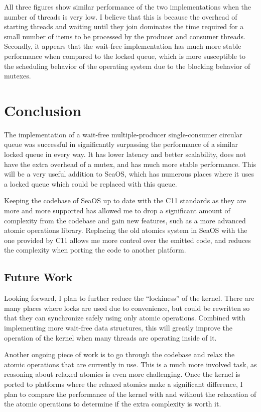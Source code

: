 \documentclass[12pt]{article}
\begin{document}
All three figures show similar performance of the two implementations when
the number of threads is very low. I believe that this is because the overhead
of starting threads and waiting until they join dominates the time required
for a small number of items to be processed by the producer and consumer threads.
Secondly, it appears that the wait-free implementation has much more stable
performance when compared to the locked queue, which is more susceptible to
the scheduling behavior of the operating system due to the blocking behavior
of mutexes.


\section{Conclusion}

The implementation of a wait-free multiple-producer single-consumer circular queue
was successful in significantly surpassing the performance of a similar locked queue in every way.
It has lower latency and better scalability, does not have the extra
overhead of a mutex, and has much more stable performance.
This will be a very useful addition to SeaOS, which has numerous
places where it uses a locked queue which could be replaced with this queue.

Keeping the codebase of SeaOS up to date with the C11 standards as they are
more and more supported has allowed me to drop a significant amount of complexity
from the codebase and gain new features, such as a more advanced atomic operations
library. Replacing the old atomics system in SeaOS with the one provided by
C11 allows me more control over the emitted code, and reduces the complexity
when porting the code to another platform.

\subsection{Future Work}

Looking forward, I plan to further reduce the ``lockiness'' of the kernel. There
are many places where locks are used due to convenience, but could be rewritten
so that they can synchronize safely using only atomic operations. Combined with
implementing more wait-free data structures, this will greatly improve the
operation of the kernel when many threads are operating inside of it.

Another ongoing piece of work is to
go through the codebase and relax the atomic operations that are currently
in use. This is a much more involved task, as reasoning about relaxed atomics
is even more challenging. Once the kernel is ported to platforms where the
relaxed atomics make a significant difference, I plan to compare the performance
of the kernel with and without the relaxation of the atomic operations to
determine if the extra complexity is worth it.
\end{document}
